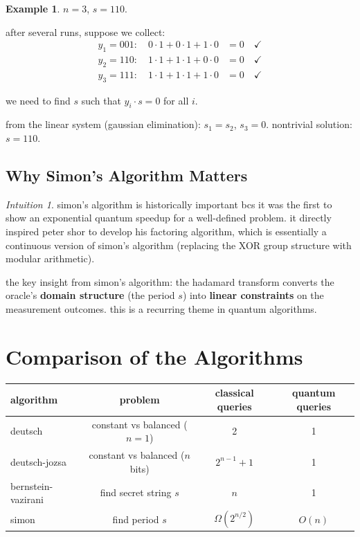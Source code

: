\documentclass[11pt,a4paper]{article}
\theoremstyle{definition}
\newtheorem{example}{Example}[section]
\theoremstyle{remark}
\newtheorem*{intuition}{Intuition}
\begin{document}
\begin{example}
$n = 3$, $s = 110$.

after several runs, suppose we collect:
\begin{align}
y_1 = 001: \quad 0 \cdot 1 + 0 \cdot 1 + 1 \cdot 0 &= 0 \quad \checkmark \\
y_2 = 110: \quad 1 \cdot 1 + 1 \cdot 1 + 0 \cdot 0 &= 0 \quad \checkmark \\
y_3 = 111: \quad 1 \cdot 1 + 1 \cdot 1 + 1 \cdot 0 &= 0 \quad \checkmark
\end{align}

we need to find $s$ such that $y_i \cdot s = 0$ for all $i$.

from the linear system (gaussian elimination): $s_1 = s_2$, $s_3 = 0$. nontrivial solution: $s = 110$.
\end{example}

\subsection{Why Simon's Algorithm Matters}

\begin{intuition}
simon's algorithm is historically important bcs it was the first to show an exponential quantum speedup for a well-defined problem. it directly inspired peter shor to develop his factoring algorithm, which is essentially a continuous version of simon's algorithm (replacing the XOR group structure with modular arithmetic).

the key insight from simon's algorithm: the hadamard transform converts the oracle's \textbf{domain structure} (the period $s$) into \textbf{linear constraints} on the measurement outcomes. this is a recurring theme in quantum algorithms.
\end{intuition}

\section{Comparison of the Algorithms}

\begin{center}
\begin{tabular}{l|c|c|c}
algorithm & problem & classical queries & quantum queries \\
\hline
deutsch & constant vs balanced ($n=1$) & 2 & 1 \\
deutsch-jozsa & constant vs balanced ($n$ bits) & $2^{n-1}+1$ & 1 \\
bernstein-vazirani & find secret string $s$ & $n$ & 1 \\
simon & find period $s$ & $\Omega(2^{n/2})$ & $O(n)$
\end{tabular}
\end{center}
\end{document}
